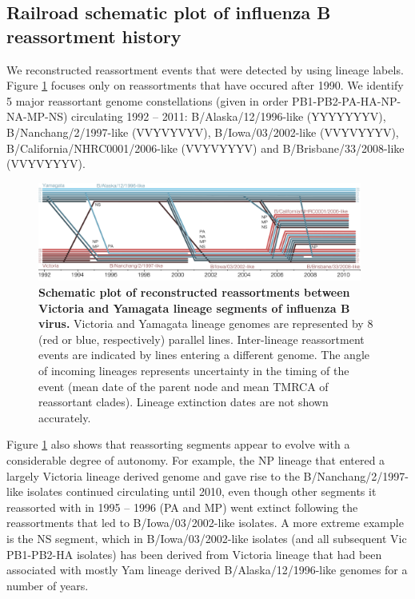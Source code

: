 \documentclass[11pt,oneside,letterpaper]{article}
\begin{document}
\subsection*{Railroad schematic plot of influenza B reassortment history}

We reconstructed reassortment events that were detected by using lineage labels.
Figure \ref{railroadPlot} focuses only on reassortments that have occured after 1990.
We identify 5 major reassortant genome constellations (given in order PB1-PB2-PA-HA-NP-NA-MP-NS) circulating 1992 -- 2011: B/Alaska/12/1996-like (YYYYYYYV), B/Nanchang/2/1997-like (VVYVYVYV), B/Iowa/03/2002-like (VVYVYYYV), B/California/NHRC0001/2006-like (VVYVYYYV) and B/Brisbane/33/2008-like (VVYVYYYV).

\begin{figure}[h]
	\centering		
	\includegraphics[width=0.95\textwidth]{figures/RailroadPlotDated.pdf}
	\caption{\textbf{Schematic plot of reconstructed reassortments between Victoria and Yamagata lineage segments of influenza B virus.}
Victoria and Yamagata lineage genomes are represented by 8 (red or blue, respectively) parallel lines.
Inter-lineage reassortment events are indicated by lines entering a different genome.
The angle of incoming lineages represents uncertainty in the timing of the event (mean date of the parent node and mean TMRCA of reassortant clades).
Lineage extinction dates are not shown accurately.}
	\label{railroadPlot}
\end{figure}

Figure \ref{railroadPlot} also shows that reassorting segments appear to evolve with a considerable degree of autonomy.
For example, the NP lineage that entered a largely Victoria lineage derived genome and gave rise to the B/Nanchang/2/1997-like isolates continued circulating until 2010, even though other segments it reassorted with in 1995 -- 1996 (PA and MP) went extinct following the reassortments that led to B/Iowa/03/2002-like isolates.
A more extreme example is the NS segment, which in B/Iowa/03/2002-like isolates (and all subsequent Vic PB1-PB2-HA isolates) has been derived from Victoria lineage that had been associated with mostly Yam lineage derived B/Alaska/12/1996-like genomes for a number of years.
\end{document}
